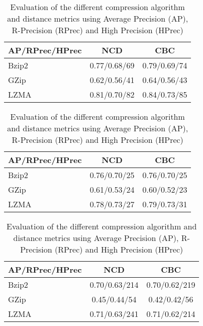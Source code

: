 \begin{table}
  \centering
  \caption{Evaluation of the different compression algorithm and distance metrics using Average Precision (AP), R-Precision (RPrec) and High Precision (HPrec)}
  \label{tab:compression_evaluation_results}

  \label{tab:compression_evaluation_oxquarry}
  \begin{tabular}{l c c}
    \toprule
    AP/RPrec/HPrec & NCD          & CBC \\
    \midrule
    Bzip2          & 0.77/0.68/69 & 0.79/0.69/74 \\
    GZip           & 0.62/0.56/41 & 0.64/0.56/43 \\
    LZMA           & 0.81/0.70/82 & 0.84/0.73/85 \\
    \bottomrule
  \end{tabular}

  \vspace{0.5cm}

  \label{tab:compression_evaluation_brunet}
  \begin{tabular}{l c c}
    \toprule
    AP/RPrec/HPrec & NCD          & CBC \\
    \midrule
    Bzip2          & 0.76/0.70/25 & 0.76/0.70/25 \\
    GZip           & 0.61/0.53/24 & 0.60/0.52/23 \\
    LZMA           & 0.78/0.73/27 & 0.79/0.73/31 \\
    \bottomrule
  \end{tabular}

  \vspace{0.5cm}

  \label{tab:compression_evaluation_st_jean}
  \begin{tabular}{l c c}
    \toprule
    AP/RPrec/HPrec & NCD           & CBC \\
    \midrule
    Bzip2          & 0.70/0.63/214 & 0.70/0.62/219 \\
    GZip           & 0.45/0.44/54  & 0.42/0.42/56 \\
    LZMA           & 0.71/0.63/241 & 0.71/0.62/214 \\
    \bottomrule
  \end{tabular}
\end{table}

